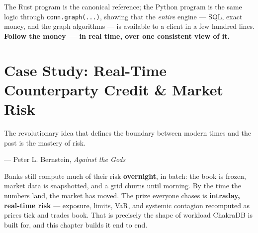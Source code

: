 \documentclass[
  11pt,
  openany]{book}
\newenvironment{Shaded}{}{}
\newcommand{\NormalTok}[1]{#1}
\begin{document}
\begin{Shaded}
\end{Shaded}

The Rust program is the canonical reference; the Python program is the
same logic through \texttt{conn.graph(...)}, showing that the
\emph{entire} engine --- SQL, exact money, and the graph algorithms ---
is available to a client in a few hundred lines. \textbf{Follow the
money --- in real time, over one consistent view of it.}

\chapter{Case Study: Real-Time Counterparty Credit \& Market
Risk}\label{case-study-real-time-counterparty-credit-market-risk}

\epigraph{The revolutionary idea that defines the boundary between modern times and the past is the mastery of risk.}{--- Peter L. Bernstein, \emph{Against the Gods}}

Banks still compute much of their risk \textbf{overnight}, in batch: the
book is frozen, market data is snapshotted, and a grid churns until
morning. By the time the numbers land, the market has moved. The prize
everyone chases is \textbf{intraday, real-time risk} --- exposure,
limits, VaR, and systemic contagion recomputed as prices tick and trades
book. That is precisely the shape of workload ChakraDB is built for, and
this chapter builds it end to end.
\end{document}
